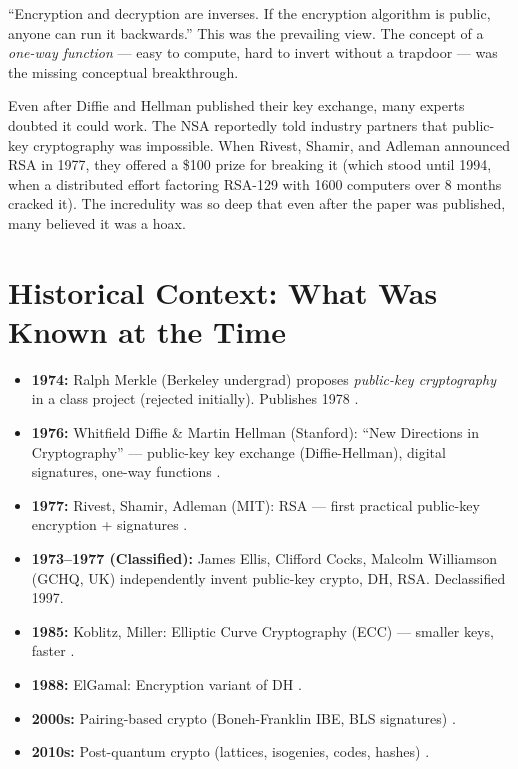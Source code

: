 ``Encryption and decryption are inverses. If the encryption algorithm is public, anyone can run it backwards.'' This was the prevailing view. The concept of a \emph{one-way function} — easy to compute, hard to invert without a trapdoor — was the missing conceptual breakthrough.

Even after Diffie and Hellman published their key exchange, many experts doubted it could work. The NSA reportedly told industry partners that public-key cryptography was impossible. When Rivest, Shamir, and Adleman announced RSA in 1977, they offered a \$100 prize for breaking it (which stood until 1994, when a distributed effort factoring RSA-129 with 1600 computers over 8 months cracked it). The incredulity was so deep that even after the paper was published, many believed it was a hoax.

\section{Historical Context: What Was Known at the Time}
\label{sec:crypto:context}

\begin{itemize}
\item \textbf{1974:} Ralph Merkle (Berkeley undergrad) proposes \emph{public-key cryptography} in a class project (rejected initially). Publishes 1978 \cite{Merkle1978}.
\item \textbf{1976:} Whitfield Diffie \& Martin Hellman (Stanford): ``New Directions in Cryptography'' --- public-key key exchange (Diffie-Hellman), digital signatures, one-way functions \cite{DiffieHellman1976}.
\item \textbf{1977:} Rivest, Shamir, Adleman (MIT): RSA --- first practical public-key encryption + signatures \cite{RSA1978}.
\item \textbf{1973--1977 (Classified):} James Ellis, Clifford Cocks, Malcolm Williamson (GCHQ, UK) independently invent public-key crypto, DH, RSA. Declassified 1997.
\item \textbf{1985:} Koblitz, Miller: Elliptic Curve Cryptography (ECC) --- smaller keys, faster \cite{Koblitz1987,Miller1985}.
\item \textbf{1988:} ElGamal: Encryption variant of DH \cite{ElGamal1985}.
\item \textbf{2000s:} Pairing-based crypto (Boneh-Franklin IBE, BLS signatures) \cite{BonehFranklin2001,BonehLynnShacham2001}.
\item \textbf{2010s:} Post-quantum crypto (lattices, isogenies, codes, hashes) \cite{NISTPQC2024}.
\end{itemize}

